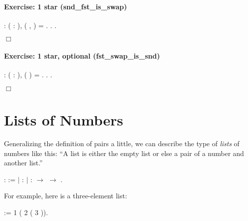 \documentclass[12pt]{report}
\begin{document}
\paragraph{Exercise: 1 star (snd\_fst\_is\_swap)}

\begin{coqdoccode}
\coqdocnoindent
{}  : \coqdockw{\ensuremath{\forall}} ( : ),\coqdoceol
\coqdocindent{1.00em}
( ,  ) =  .\coqdoceol
\coqdocnoindent
{}.\coqdoceol
 .\coqdoceol
\end{coqdoccode}
\ensuremath{\Box} 

\paragraph{Exercise: 1 star, optional (fst\_swap\_is\_snd)}

\begin{coqdoccode}
\coqdocnoindent
{}  : \coqdockw{\ensuremath{\forall}} ( : ),\coqdoceol
\coqdocindent{1.00em}
 ( ) =  .\coqdoceol
\coqdocnoindent
{}.\coqdoceol
 .\coqdoceol
\end{coqdoccode}
\ensuremath{\Box} \begin{coqdoccode}
\coqdocemptyline
\end{coqdoccode}
\section{Lists of Numbers}



 Generalizing the definition of pairs a little, we can
    describe the type of \textit{lists} of numbers like this: ``A list is
    either the empty list or else a pair of a number and another
    list.'' \begin{coqdoccode}
\coqdocemptyline
\coqdocnoindent
{}  :  :=\coqdoceol
\coqdocindent{1.00em}
\ensuremath{|}  : \coqdoceol
\coqdocindent{1.00em}
\ensuremath{|}  :  \ensuremath{\rightarrow}  \ensuremath{\rightarrow} .\coqdoceol
\coqdocemptyline
\end{coqdoccode}
For example, here is a three-element list: \begin{coqdoccode}
\coqdocemptyline
\coqdocnoindent
{}  :=  1 ( 2 ( 3 )).\coqdoceol
\coqdocemptyline
\end{coqdoccode}
\end{document}
